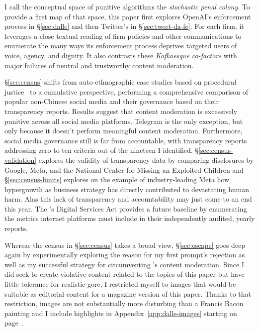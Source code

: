 I call the conceptual space of punitive algorithms the \emph{stochastic penal
colony}. To provide a first map of that space, this paper first explores
OpenAI's enforcement process in \S\ref{sec:dalle} and then Twitter's in
\S\ref{sec:tweet-da-fe}. For each firm, it leverages a close textual reading of
firm policies and other communications to enumerate the many ways its
enforcement process deprives targeted users of voice, agency, and dignity. It
also contrasts these \emph{Kafkaesque co-factors} with major failures of neutral
and trustworthy content moderation.

\S\ref{sec:census} shifts from auto-ethnographic case studies based on
procedural justice~\cite{Tyler2003,Tyler2006,Tyler2007} to a cumulative
perspective, performing a comprehensive comparison of popular non-Chinese social
media and their governance based on their transparency reports. Results suggest
that content moderation is excessively punitive across all social media
platforms. Telegram is the only exception, but only because it doesn't perform
meaningful content moderation. Furthermore, social media governance still is far
from accountable, with transparency reports addressing zero to ten criteria out
of the nineteen I identified. \S\ref{sec:census-validation} explores the
validity of transparency data by comparing disclosures by Google, Meta, and the
National Center for Missing an Exploited Children and \S\ref{sec:census-limits}
explores on the example of industry-leading Meta how hypergrowth as business
strategy has directly contributed to devastating human harm. Alas this lack of
transparency and accountability may just come to an end this year. The \EU's
Digital Services Act provides a future baseline by enumerating the metrics
internet platforms must include in their independently audited, yearly reports.

Whereas the census in \S\ref{sec:census} takes a broad view, \S\ref{sec:escape}
goes deep again by experimentally exploring the reason for my first prompt's
rejection as well as my successful strategy for circumventing \DALLE's content
moderation. Since I did seek to create violative content related to the topics
of this paper but have little tolerance for realistic gore, I restricted myself
to images that would be suitable as editorial content for a magazine version of
this paper. Thanks to that restriction, images are not substantially more
disturbing than a Francis Bacon painting and I include highlights in
Appendix~\ref{app:dalle-images} starting on page~\pageref{app:dalle-images}.

